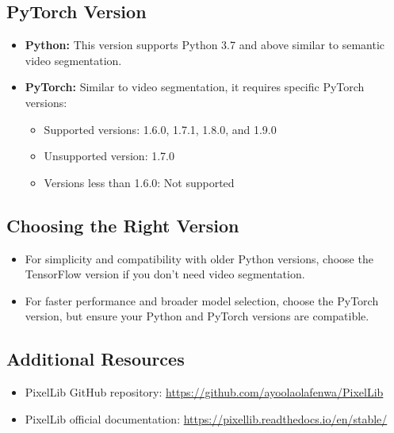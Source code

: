 \subsection*{PyTorch Version}
\begin{itemize}[label=--]
    \item \textbf{Python:} This version supports Python 3.7 and above similar to semantic video segmentation.
    \item \textbf{PyTorch:} Similar to video segmentation, it requires specific PyTorch versions:
    \begin{itemize}[label=$\bullet$]
        \item Supported versions: 1.6.0, 1.7.1, 1.8.0, and 1.9.0
        \item Unsupported version: 1.7.0
        \item Versions less than 1.6.0: Not supported
    \end{itemize}
\end{itemize}

\subsection*{Choosing the Right Version}
\begin{itemize}[label=--]
    \item For simplicity and compatibility with older Python versions, choose the TensorFlow version if you don't need video segmentation.
    \item For faster performance and broader model selection, choose the PyTorch version, but ensure your Python and PyTorch versions are compatible.
\end{itemize}

\subsection*{Additional Resources}
\begin{itemize}[label=--]
    \item PixelLib GitHub repository: \url{https://github.com/ayoolaolafenwa/PixelLib}
    \item PixelLib official documentation: \url{https://pixellib.readthedocs.io/en/stable/}
\end{itemize}

